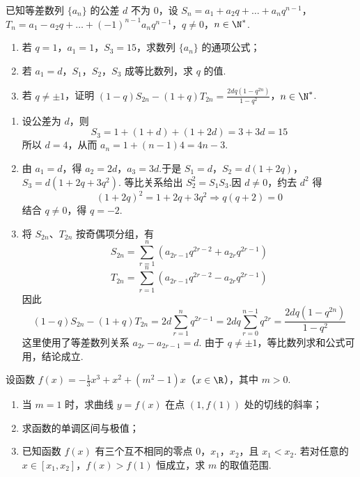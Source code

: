 \begin{problem}
已知等差数列 \(\{a_{n}\}\) 的公差 \(d\) 不为 0，设 \(S_{n} = a_{1} + a_{2}q + \dots +a_{n}q^{n - 1}\)，\(T_{n} = a_{1} - a_{2}q + \dots +( -1)^{n - 1}a_{n}q^{n - 1}\)，\(q\neq 0\)，\(n\in \N^{*}\).
\begin{enumerate}
\item 若 \(q = 1\)，\(a_{1} = 1\)，\(S_{3} = 15\)，求数列 \(\{a_{n}\}\) 的通项公式；
\item 若 \(a_{1} = d\)，\(S_{1}\)，\(S_{2}\)，\(S_{3}\) 成等比数列，求 \(q\) 的值.
\item 若 \(q \neq \pm 1\)，证明 \((1 - q)S_{2n} - (1 + q)T_{2n} = \frac{2dq(1 - q^{2n})}{1 - q^2}\)，\(n \in \N^{*}\).
\end{enumerate}
\end{problem}

\begin{solution}
\begin{enumerate}
\item 设公差为 \(d\)，则
\[
S_3=1+(1+d)+(1+2d)=3+3d=15
\]
所以 \(d=4\)，从而 \(a_n=1+(n-1)4=4n-3\).

\item 由 \(a_1=d\)，得 \(a_2=2d\)，\(a_3=3d\).于是
\(S_1=d\)，\(S_2=d(1+2q)\)，\(S_3=d(1+2q+3q^2)\).
等比关系给出 \(S_2^2=S_1S_3\).因 \(d\ne0\)，约去 \(d^2\) 得
\[
(1+2q)^2=1+2q+3q^2
\Longrightarrow q(q+2)=0
\]
结合 \(q\ne0\)，得 \(q=-2\).

\item 将 \(S_{2n}\)、\(T_{2n}\) 按奇偶项分组，有
\[
S_{2n}=\sum_{r=1}^{n}\left(a_{2r-1}q^{2r-2}+a_{2r}q^{2r-1}\right)
\]
\[
T_{2n}=\sum_{r=1}^{n}\left(a_{2r-1}q^{2r-2}-a_{2r}q^{2r-1}\right)
\]
因此
\[
(1-q)S_{2n}-(1+q)T_{2n}
=2d\sum_{r=1}^n q^{2r-1}
=2dq\sum_{r=0}^{n-1}q^{2r}
=\frac{2dq(1-q^{2n})}{1-q^2}
\]
这里使用了等差数列关系 \(a_{2r}-a_{2r-1}=d\). 由于 \(q\ne\pm1\)，等比数列求和公式可用，结论成立.
\end{enumerate}
\end{solution}

\begin{problem}
设函数 \( f(x) = -\frac{1}{3} x^3 + x^2 + (m^2 - 1)x \)（\(x \in \R\)），其中 \(m > 0\).
\begin{enumerate}
\item 当 \(m = 1\) 时，求曲线 \(y = f(x)\) 在点 \((1, f(1))\) 处的切线的斜率；
\item 求函数的单调区间与极值；
\item 已知函数 \(f(x)\) 有三个互不相同的零点 \(0\)，\(x_1\)，\(x_2\)，且 \(x_1 < x_2\). 若对任意的 \(x \in [x_1, x_2]\)，\(f(x) > f(1)\) 恒成立，求 \(m\) 的取值范围.
\end{enumerate}
\end{problem}

